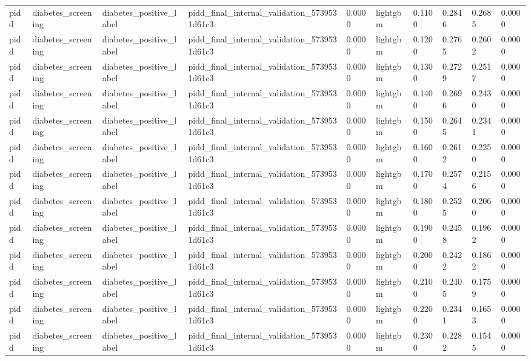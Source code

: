 \begin{tabular}{llllllllll}
pidd & diabetes\_screening & diabetes\_positive\_label & pidd\_final\_internal\_validation\_5739531d61c3 & 0.0000 & lightgbm & 0.1100 & 0.2846 & 0.2685 & 0.0000 \\
pidd & diabetes\_screening & diabetes\_positive\_label & pidd\_final\_internal\_validation\_5739531d61c3 & 0.0000 & lightgbm & 0.1200 & 0.2765 & 0.2602 & 0.0000 \\
pidd & diabetes\_screening & diabetes\_positive\_label & pidd\_final\_internal\_validation\_5739531d61c3 & 0.0000 & lightgbm & 0.1300 & 0.2729 & 0.2517 & 0.0000 \\
pidd & diabetes\_screening & diabetes\_positive\_label & pidd\_final\_internal\_validation\_5739531d61c3 & 0.0000 & lightgbm & 0.1400 & 0.2696 & 0.2430 & 0.0000 \\
pidd & diabetes\_screening & diabetes\_positive\_label & pidd\_final\_internal\_validation\_5739531d61c3 & 0.0000 & lightgbm & 0.1500 & 0.2645 & 0.2341 & 0.0000 \\
pidd & diabetes\_screening & diabetes\_positive\_label & pidd\_final\_internal\_validation\_5739531d61c3 & 0.0000 & lightgbm & 0.1600 & 0.2612 & 0.2250 & 0.0000 \\
pidd & diabetes\_screening & diabetes\_positive\_label & pidd\_final\_internal\_validation\_5739531d61c3 & 0.0000 & lightgbm & 0.1700 & 0.2574 & 0.2156 & 0.0000 \\
pidd & diabetes\_screening & diabetes\_positive\_label & pidd\_final\_internal\_validation\_5739531d61c3 & 0.0000 & lightgbm & 0.1800 & 0.2525 & 0.2060 & 0.0000 \\
pidd & diabetes\_screening & diabetes\_positive\_label & pidd\_final\_internal\_validation\_5739531d61c3 & 0.0000 & lightgbm & 0.1900 & 0.2458 & 0.1962 & 0.0000 \\
pidd & diabetes\_screening & diabetes\_positive\_label & pidd\_final\_internal\_validation\_5739531d61c3 & 0.0000 & lightgbm & 0.2000 & 0.2422 & 0.1862 & 0.0000 \\
pidd & diabetes\_screening & diabetes\_positive\_label & pidd\_final\_internal\_validation\_5739531d61c3 & 0.0000 & lightgbm & 0.2100 & 0.2405 & 0.1759 & 0.0000 \\
pidd & diabetes\_screening & diabetes\_positive\_label & pidd\_final\_internal\_validation\_5739531d61c3 & 0.0000 & lightgbm & 0.2200 & 0.2341 & 0.1653 & 0.0000 \\
pidd & diabetes\_screening & diabetes\_positive\_label & pidd\_final\_internal\_validation\_5739531d61c3 & 0.0000 & lightgbm & 0.2300 & 0.2282 & 0.1545 & 0.0000 \\

\end{tabular}
